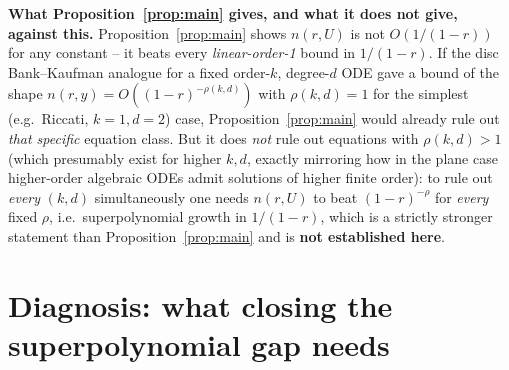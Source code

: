 \documentclass[11pt]{article}
\theoremstyle{remark}
\begin{document}
\textbf{What Proposition~\ref{prop:main} gives, and what it does not give, against this.}
Proposition~\ref{prop:main} shows $n(r,U)$ is not $O(1/(1-r))$ for any constant -- it beats every
\emph{linear-order-1} bound in $1/(1-r)$. If the disc Bank--Kaufman analogue for a fixed order-$k$,
degree-$d$ ODE gave a bound of the shape $n(r,y)=O((1-r)^{-\rho(k,d)})$ with $\rho(k,d)=1$ for the
simplest (e.g.\ Riccati, $k=1,d=2$) case, Proposition~\ref{prop:main} would already rule out
\emph{that specific} equation class. But it does \emph{not} rule out equations with $\rho(k,d)>1$
(which presumably exist for higher $k,d$, exactly mirroring how in the plane case higher-order
algebraic ODEs admit solutions of higher finite order): to rule out \emph{every} $(k,d)$
simultaneously one needs $n(r,U)$ to beat $(1-r)^{-\rho}$ for \emph{every} fixed $\rho$, i.e.\
superpolynomial growth in $1/(1-r)$, which is a strictly stronger statement than
Proposition~\ref{prop:main} and is \textbf{not established here}.

\section{Diagnosis: what closing the superpolynomial gap needs}\label{sec:diagnosis}
\end{document}
